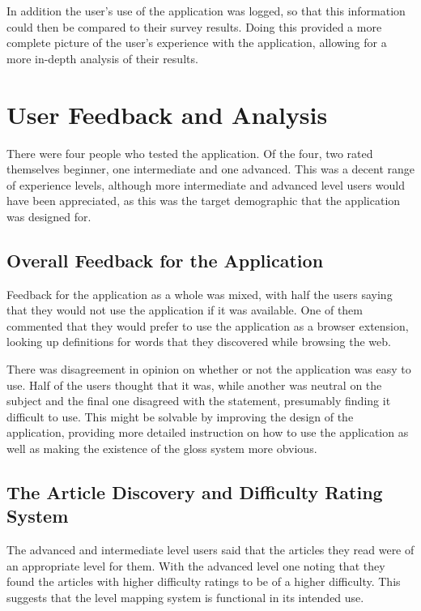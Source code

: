In addition the user's use of the application was logged, so that this information could then be compared to their survey results. Doing this provided a more complete picture of the user's experience with the application, allowing for a more in-depth analysis of their results. 

\section{User Feedback and Analysis}

There were four people who tested the application. Of the four, two rated themselves beginner, one intermediate and one advanced. This was a decent range of experience levels, although more intermediate and advanced level users would have been appreciated, as this was the target demographic that the application was designed for.

\subsection{Overall Feedback for the Application}

Feedback for the application as a whole was mixed, with half the users saying that they would not use the application if it was available. One of them commented that they would prefer to use the application as a browser extension, looking up definitions for words that they discovered while browsing the web.

There was disagreement in opinion on whether or not the application was easy to use. Half of the users thought that it was, while another was neutral on the subject and the final one disagreed with the statement, presumably finding it difficult to use. This might be solvable by improving the design of the application, providing more detailed instruction on how to use the application as well as making the existence of the gloss system more obvious.


\subsection{The Article Discovery and Difficulty Rating System}

The advanced and intermediate level users said that the articles they read were of an appropriate level for them. With the advanced level one noting that they found the articles with higher difficulty ratings to be of a higher difficulty. This suggests that the level mapping system is functional in its intended use.  

